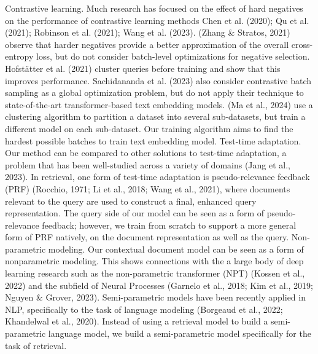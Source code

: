 Contrastive learning. Much research has focused on the effect of hard negatives on the performance of contrastive learning methods Chen et al. (2020); Qu et al. (2021); Robinson et al. (2021); Wang et al. (2023). (Zhang \& Stratos, 2021) observe that harder negatives provide a better approximation of the overall cross-entropy loss, but do not consider batch-level optimizations for negative selection. Hofstätter et al. (2021) cluster queries before training and show that this improves performance. Sachidananda et al. (2023) also consider contrastive batch sampling as a global optimization problem, but do not apply their technique to state-of-the-art transformer-based text embedding models. (Ma et al., 2024) use a clustering algorithm to partition a dataset into several sub-datasets, but train a different model on each sub-dataset. Our training algorithm aims to find the hardest possible batches to train text embedding model.
Test-time adaptation. Our method can be compared to other solutions to test-time adaptation, a problem that has been well-studied across a variety of domains (Jang et al., 2023). In retrieval, one form of test-time adaptation is pseudo-relevance feedback (PRF) (Rocchio, 1971; Li et al., 2018; Wang et al., 2021), where documents relevant to the query are used to construct a final, enhanced query representation. The query side of our model can be seen as a form of pseudo-relevance feedback; however, we train from scratch to support a more general form of PRF natively, on the document representation as well as the query.
Non-parametric modeling. Our contextual document model can be seen as a form of nonparametric modeling. This shows connections with the a large body of deep learning research such as the non-parametric transformer (NPT) (Kossen et al., 2022) and the subfield of Neural Processes (Garnelo et al., 2018; Kim et al., 2019; Nguyen \& Grover, 2023). Semi-parametric models have been recently applied in NLP, specifically to the task of language modeling (Borgeaud et al., 2022; Khandelwal et al., 2020). Instead of using a retrieval model to build a semi-parametric language model, we build a semi-parametric model specifically for the task of retrieval.

